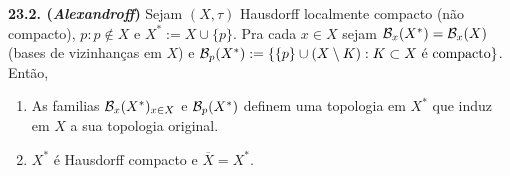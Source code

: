 \begin{theorem}
    \textbf{23.2. (\emph{Alexandroff})} Sejam \((X, \tau)\) Hausdorff localmente compacto (não compacto), \(p : p \notin X\) e \(X^*:= X \cup \{p\}\). Pra cada \(x \in X\) sejam \(\mathcal{B}_x(X^*) = \mathcal{B}_x(X)\) (bases de vizinhanças em \(X\))  e  \(\mathcal{B}_p(X^*):=\{\{p\} \cup (X\setminus K) : K\subset X \text{ é compacto}\}\). Então, 
    \begin{enumerate}[label = (\alph*), left = 0.6cm]
        \item As familias \(\mathcal{B}_x(X^*)_{x\in X}\) e \(\mathcal{B}_p(X^*)\) definem uma topologia em \(X^*\) que induz em \(X\) a sua topologia original. 
        \item \(X^*\) é Hausdorff compacto e \(\overline{X} = X^*\).  
    \end{enumerate}
\end{theorem}
